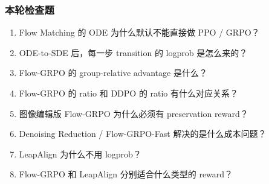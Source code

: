 \subsubsection{本轮检查题}

\begin{enumerate}[leftmargin=1.5em]
  \item Flow Matching 的 ODE 为什么默认不能直接做 PPO / GRPO？
  \item ODE-to-SDE 后，每一步 transition 的 logprob 是怎么来的？
  \item Flow-GRPO 的 group-relative advantage 是什么？
  \item Flow-GRPO 的 ratio 和 DDPO 的 ratio 有什么对应关系？
  \item 图像编辑版 Flow-GRPO 为什么必须有 preservation reward？
  \item Denoising Reduction / Flow-GRPO-Fast 解决的是什么成本问题？
  \item LeapAlign 为什么不用 logprob？
  \item Flow-GRPO 和 LeapAlign 分别适合什么类型的 reward？
\end{enumerate}
